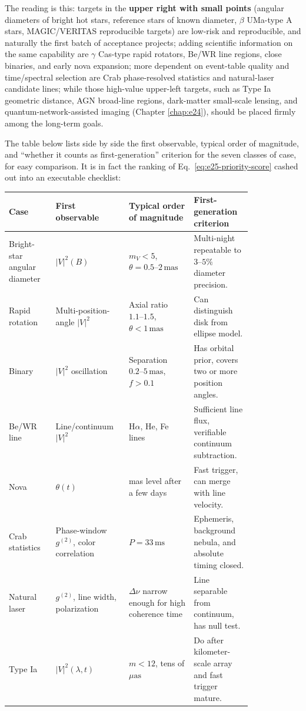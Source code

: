 The reading is this: targets in the \textbf{upper right with small points} (angular diameters of bright hot stars, reference stars of known diameter, \(\beta\) UMa-type A stars, MAGIC/VERITAS reproducible targets) are low-risk and reproducible, and naturally the first batch of acceptance projects; adding scientific information on the same capability are \(\gamma\) Cas-type rapid rotators, Be/WR line regions, close binaries, and early nova expansion; more dependent on event-table quality and time/spectral selection are Crab phase-resolved statistics and natural-laser candidate lines; while those high-value upper-left targets, such as Type Ia geometric distance, AGN broad-line regions, dark-matter small-scale lensing, and quantum-network-assisted imaging (Chapter \ref{chap:e24}), should be placed firmly among the long-term goals.

The table below lists side by side the first observable, typical order of magnitude, and ``whether it counts as first-generation'' criterion for the seven classes of case, for easy comparison. It is in fact the ranking of Eq.\ \eqref{eq:e25-priority-score} cashed out into an executable checklist:

\begin{longtable}{p{0.17\linewidth}p{0.22\linewidth}p{0.23\linewidth}p{0.20\linewidth}}
\toprule
Case & First observable & Typical order of magnitude & First-generation criterion \\
\midrule
Bright-star angular diameter & \(|V|^2(B)\) & \(m_V<5\), \(\theta=0.5\text{--}2\,\mathrm{mas}\) & Multi-night repeatable to \(3\text{--}5\%\) diameter precision. \\
Rapid rotation & Multi-position-angle \(|V|^2\) & Axial ratio \(1.1\text{--}1.5\), \(\theta<1\,\mathrm{mas}\) & Can distinguish disk from ellipse model. \\
Binary & \(|V|^2\) oscillation & Separation \(0.2\text{--}5\,\mathrm{mas}\), \(f>0.1\) & Has orbital prior, covers two or more position angles. \\
Be/WR line & Line/continuum \(|V|^2\) & \(\mathrm{H}\alpha\), He, Fe lines & Sufficient line flux, verifiable continuum subtraction. \\
Nova & \(\theta(t)\) & mas level after a few days & Fast trigger, can merge with line velocity. \\
Crab statistics & Phase-window \(g^{(2)}\), color correlation & \(P=33\,\mathrm{ms}\) & Ephemeris, background nebula, and absolute timing closed. \\
Natural laser & \(g^{(2)}\), line width, polarization & \(\Delta\nu\) narrow enough for high coherence time & Line separable from continuum, has null test. \\
Type Ia & \(|V|^2(\lambda,t)\) & \(m<12\), tens of \(\mu\mathrm{as}\) & Do after kilometer-scale array and fast trigger mature. \\
\bottomrule
\end{longtable}

